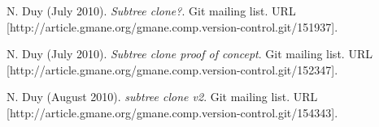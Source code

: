 \documentclass[copyrightwanted=false]{sigplanconf}
\begin{document}
\begin{thebibliography}{10}
    N. Duy (July 2010).
    \newblock \emph{Subtree clone?}.
    \newblock Git mailing list.
    \newblock URL
    [http://article.gmane.org/gmane.comp.version-control.git/151937].

    N. Duy (July 2010).
    \newblock \emph{Subtree clone proof of concept}.
    \newblock Git mailing list.
    \newblock URL
    [http://article.gmane.org/gmane.comp.version-control.git/152347].

    N. Duy (August 2010).
    \newblock \emph{subtree clone v2}.
    \newblock Git mailing list.
    \newblock URL
    [http://article.gmane.org/gmane.comp.version-control.git/154343].

\end{thebibliography}
\end{document}
